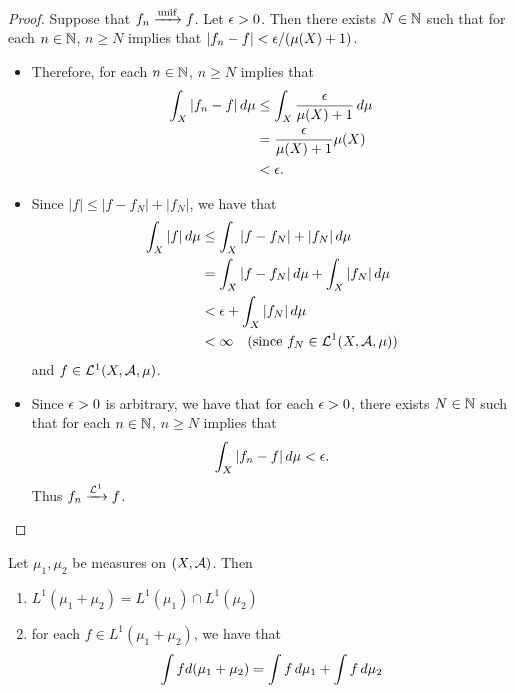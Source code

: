 \documentclass{book}
\begin{document}
	\begin{proof}
		Suppose that $f_n \xrightarrow{\text{unif}} f$. Let $\epsilon > 0$. Then there exists $N \in \mathbb{N}$ such that for each $n \in \mathbb{N}$, $n \geq N$ implies that $|f_n - f| < \epsilon/(\mu(X) + 1)$. 
		\begin{itemize}
			\item Therefore, for each $n \in \mathbb{N}$, $n \geq N$ implies that 
			\begin{align*}
				\int_X |f_n - f| \, d \mu 
				& \leq \int_X \frac{\epsilon}{\mu(X) + 1} \, d \mu \\
				& = \frac{\epsilon}{\mu(X) + 1} \mu(X) \\
				& < \epsilon.
			\end{align*}
			\item Since $|f| \leq |f - f_N| + |f_N|$, we have that
			\begin{align*}
				\int_X |f| \, d \mu 
				& \leq \int_X |f - f_N| + |f_N| \, d \mu \\
				& = \int_X |f - f_N| \, d \mu  + \int_X |f_N| \, d \mu \\
				& < \epsilon + \int_X |f_N| \, d \mu \\
				& < \infty \quad \text{(since $f_N \in \mathcal{L}^1(X, \mathcal{A}, \mu)$)} 
			\end{align*}
			and $f \in \mathcal{L}^1(X, \mathcal{A}, \mu)$.  
			\item Since $\epsilon > 0$ is arbitrary, we have that for each $\epsilon >0$, there exists $N \in \mathbb{N}$ such that for each $n \in \mathbb{N}$, $n \geq N$ implies that 
			$$\int_X |f_n - f| \, d \mu < \epsilon.$$
			Thus $f_n \xrightarrow{\mathcal{L}^1} f$.
		\end{itemize}
	\end{proof}
	
	\begin{ex}  
		Let $\mu_1, \mu_2$ be measures on $(X, \mathcal{A})$. Then
		\begin{enumerate}
			\item $L^1(\mu_1 + \mu_2) = L^1(\mu_1) \cap L^1(\mu_2)$
			
			\item for each $f \in L^1(\mu_1 + \mu_2)$, we have that $$\int f d(\mu_1 + \mu_2) = \int f \, d \mu_1 + \int f \, d \mu_2$$
		\end{enumerate}
	\end{ex}
	
\end{document}
